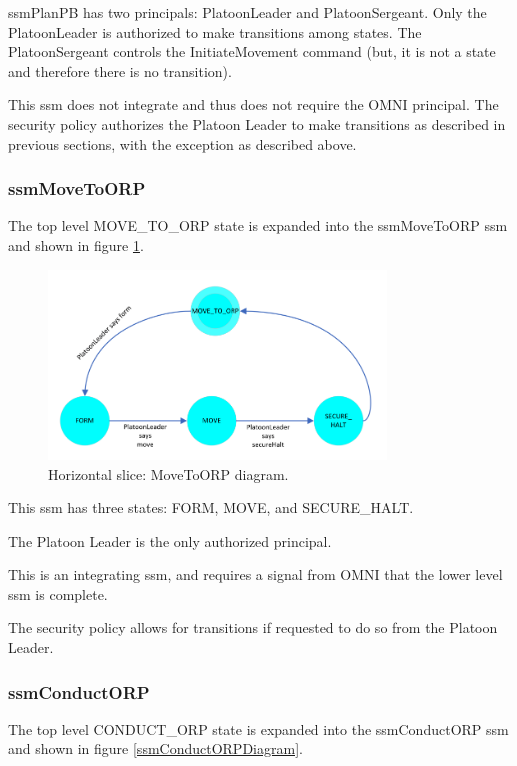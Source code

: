 \documentclass[../../main/main.tex]{subfiles}
\begin{document}
ssmPlanPB has two principals: PlatoonLeader and PlatoonSergeant.  Only the PlatoonLeader is authorized to make transitions among states.  The PlatoonSergeant controls the InitiateMovement command (but, it is not a state and therefore there is no transition).

This \gls{ssm} does not integrate and thus does not require the OMNI principal.  The security policy authorizes the Platoon Leader to make transitions as described in previous sections, with the exception as described above.  


\clearpage
\subsubsection{ssmMoveToORP}\label{sssec:ssmMoveToORP}
The top level MOVE_TO_ORP state is expanded into the ssmMoveToORP \gls{ssm} and shown in figure \ref{ssmMoveToORPDiagram}.

\begin{figure}[!h]
\centering
\includegraphics[width=0.8\textwidth]{../figures/ssmMoveToORPDiagram}
\caption{\label{ssmMoveToORPDiagram} Horizontal slice: MoveToORP diagram.}
\end{figure}

This \gls{ssm} has three states: FORM, MOVE, and SECURE_HALT.  

The Platoon Leader is the only authorized principal.  

This is an integrating \gls{ssm}, and requires a signal from OMNI that the lower level \gls{ssm} is complete.

The security policy allows for transitions if requested to do so from the Platoon Leader.  

\clearpage

\subsubsection{ssmConductORP}\label{sssec:ssmConductORP}
The top level CONDUCT_ORP state is expanded into the ssmConductORP \gls{ssm} and shown in figure \ref{ssmConductORPDiagram}.
\end{document}
